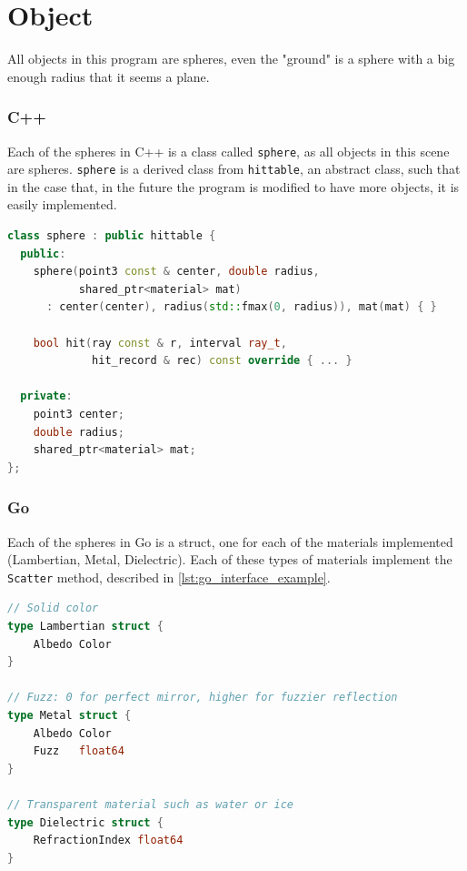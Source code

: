 

\section{Object}
\label{sec:sphere-object}
All objects in this program are spheres, even the "ground" is a sphere with a big enough radius that it seems a plane.

\subsubsection{C++}
Each of the spheres in C++ is a class called \texttt{sphere}, as all objects in this scene are spheres. \texttt{sphere} is a derived class from \texttt{hittable}, an abstract class, such that in the case that, in the future the program is modified to have more objects, it is easily implemented. 

\begin{lstlisting}[language=C++, caption={Sphere Class for C++}, label={lst:sphere_cpp}]
class sphere : public hittable {
  public:
    sphere(point3 const & center, double radius,
           shared_ptr<material> mat)
      : center(center), radius(std::fmax(0, radius)), mat(mat) { }

    bool hit(ray const & r, interval ray_t,
             hit_record & rec) const override { ... }

  private:
    point3 center;
    double radius;
    shared_ptr<material> mat;
};
\end{lstlisting}



\subsubsection{Go}
Each of the spheres in Go is a struct, one for each of the materials implemented (Lambertian, Metal, Dielectric). Each of these types of materials implement the \texttt{Scatter} method, described in \autoref{lst:go_interface_example}.

\begin{lstlisting}[language=Go, caption={Go materials structs.}, label={lst:go_materials_structs}]
// Solid color
type Lambertian struct {
	Albedo Color
}

// Fuzz: 0 for perfect mirror, higher for fuzzier reflection
type Metal struct {
	Albedo Color
	Fuzz   float64 
}

// Transparent material such as water or ice
type Dielectric struct {
	RefractionIndex float64
}
\end{lstlisting}



